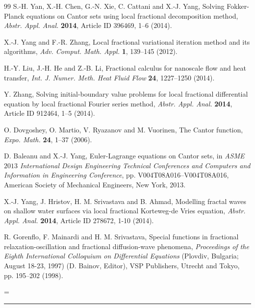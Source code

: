 \documentclass[10pt]{NSP1}
\begin{document}
\begin{thebibliography}{99}
S.-H. Yan, X.-H. Chen, G.-N. Xie, C. Cattani and X.-J. Yang,
Solving Fokker-Planck equations on Cantor sets
using local fractional decomposition method,
{\it Abstr. Appl. Anal.} {\bf 2014}, Article ID 396469, 1--6 (2014).

X.-J. Yang and F.-R. Zhang, Local fractional variational iteration method
and its algorithms, {\it Adv. Comput. Math. Appl.} {\bf 1}, 139--145 (2012).

H.-Y. Liu, J.-H. He and Z.-B. Li, Fractional calculus for nanoscale
flow and heat transfer, {\it Int. J. Numer. Meth. Heat Fluid Flow}
{\bf 24}, 1227--1250 (2014).

Y. Zhang, Solving initial-boundary value problems for local fractional differential equation
by local fractional Fourier series method, {\it Abstr. Appl. Anal.} {\bf 2014},
Article ID 912464, 1--5 (2014).

O. Dovgoshey, O. Martio, V. Ryazanov and M. Vuorinen, The Cantor function,
{\it Expo. Math.} {\bf 24}, 1--37 (2006).

D. Baleanu and X.-J. Yang, Euler-Lagrange equations on Cantor sets,
in {\it ASME $2013$ International Design Engineering Technical Conferences and Computers and
Information in Engineering Conference}, pp. V004T08A016--V004T08A016,
American Society of Mechanical Engineers, New York, 2013.

X.-J. Yang, J. Hristov, H. M. Srivastava and B. Ahmad,
Modelling fractal waves on shallow water surfaces via local fractional
Korteweg-de Vries equation, {\it Abstr. Appl. Anal.} {\bf 2014},
Article ID 278672, 1-10 (2014).

R. Gorenflo, F. Mainardi and H. M. Srivastava, Special
functions in fractional relaxation-oscillation and
fractional diffusion-wave phenomena,
\textit{Proceedings of the Eighth International Colloquium on
Differential Equations} (Plovdiv, Bulgaria; August 18-23, 1997)
(D. Bainov, Editor), VSP Publishers, Utrecht and Tokyo, pp. 195--202 (1998).

\end{thebibliography}


\emergencystretch=\hsize

\begin{center}
\rule{6 cm}{0.02 cm}
\end{center}
\end{document}
